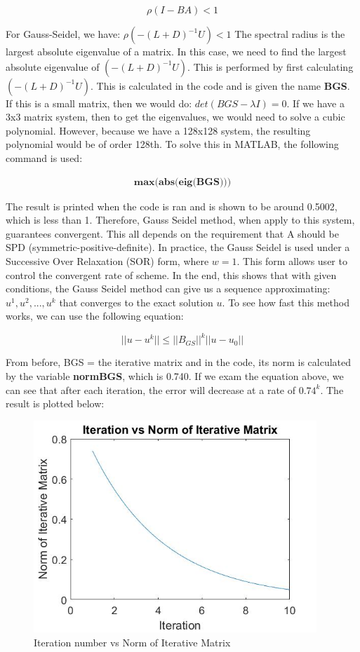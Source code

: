 \documentclass{article}
\begin{document}
\begin{equation*}
\rho(I-BA) < 1
\end{equation*}

\noindent
For Gauss-Seidel, we have: $\rho(-(L+D)^{-1}U)<1$
\noindent
The spectral radius is the largest absolute eigenvalue of a matrix. In this case, we need to find the largest absolute eigenvalue of $(-(L+D)^{-1}U)$. This is performed by first calculating $(-(L+D)^{-1}U)$.  This is calculated in the code and is given the name \textbf{BGS}.  If this is a small matrix, then we would do: $det(BGS - \lambda I) = 0 $.  If we have a 3x3 matrix system, then to get the eigenvalues, we would need to solve a cubic polynomial. However, because we have a 128x128 system, the resulting polynomial would be of order 128th.  To solve this in MATLAB, the following command is used: 

\begin{align*}
\textbf{max(abs(eig(BGS)))}
\end{align*}

\noindent
The result is printed when the code is ran and is shown to be around 0.5002, which is less than 1.  Therefore, Gauss Seidel method, when apply to this system, guarantees convergent. This all depends on the requirement that A should be SPD (symmetric-positive-definite). In practice, the Gauss Seidel is used under a Successive Over Relaxation (SOR) form, where $w = 1$.  This form allows user to control the convergent rate of scheme. In the end, this shows that with given conditions, the Gauss Seidel method can give us a sequence approximating: $u^1, u^2,..., u^k$ that converges to the exact solution $u$. To see how fast this method works, we can use the following equation: 

\begin{equation}
	||u-u^k|| \leq ||B_{GS}||^k ||u-u_0||
\end{equation}

\noindent
From before, BGS = the iterative matrix and in the code, its norm is calculated by the variable \textbf{normBGS}, which is 0.740. If we exam the equation above, we can see that after each iteration, the error will decrease at a rate of $0.74^k$. The result is plotted below: 


\begin{figure}[H]
	\includegraphics[width=\linewidth,height=80mm]{norm_plot_GS.jpg}	
	
	\caption{Iteration number vs Norm of Iterative Matrix}
\end{figure}
\end{document}
